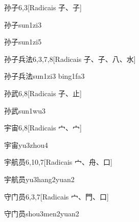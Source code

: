 \begin{entry}{孙子}{6,3}[Radicais ⼦、⼦]
  \begin{phonetics}{孙子}{sun1zi3}
  \end{phonetics}
  \begin{phonetics}{孙子}{sun1zi5}
  \end{phonetics}
\end{entry}

\begin{entry}{孙子兵法}{6,3,7,8}[Radicais ⼦、⼦、⼋、⽔]
  \begin{phonetics}{孙子兵法}{sun1zi3 bing1fa3}
  \end{phonetics}
\end{entry}

\begin{entry}{孙武}{6,8}[Radicais ⼦、⽌]
  \begin{phonetics}{孙武}{sun1wu3}
  \end{phonetics}
\end{entry}

\begin{entry}{宇宙}{6,8}[Radicais ⼧、⼧]
  \begin{phonetics}{宇宙}{yu3zhou4}
  \end{phonetics}
\end{entry}

\begin{entry}{宇航员}{6,10,7}[Radicais ⼧、⾈、⼝]
  \begin{phonetics}{宇航员}{yu3hang2yuan2}
  \end{phonetics}
\end{entry}

\begin{entry}{守门员}{6,3,7}[Radicais ⼧、⾨、⼝]
  \begin{phonetics}{守门员}{shou3men2yuan2}
  \end{phonetics}
\end{entry}

